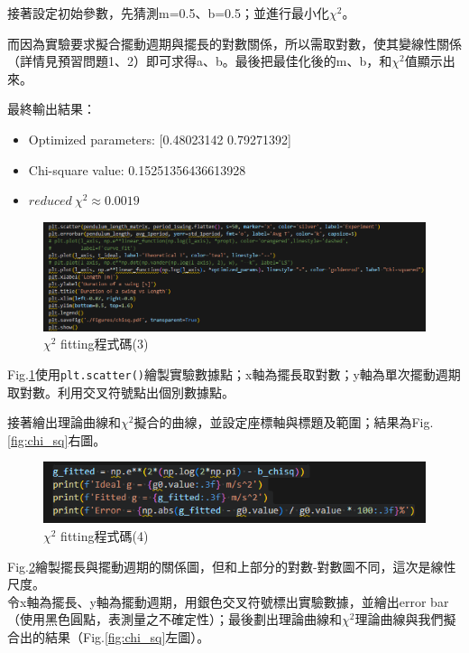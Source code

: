 \documentclass[12pt,a4paper]{article}
\begin{document}
\begin{CJK}{UTF8}{bkai}
接著設定初始參數，先猜測m=0.5、b=0.5；並進行最小化$\chi^2$。

而因為實驗要求擬合擺動週期與擺長的對數關係，所以需取對數，使其變線性關係（詳情見預習問題1、2）即可求得a、b。最後把最佳化後的m、b，和$\chi^2$值顯示出來。

最終輸出結果：
\begin{itemize}
    \item Optimized parameters: [0.48023142 0.79271392]
    \item Chi-square value: 0.15251356436613928
    \item $reduced \ \chi^2 \approx 0.0019$
\end{itemize}



\begin{figure}[h]
    \centering
    \includegraphics[width=1\linewidth]{chi3.png}
    \caption{$\chi ^2$ fitting程式碼(3)}
    \label{fig:chi3}
\end{figure}


Fig.\ref{fig:chi3}使用\texttt{plt.scatter()}繪製實驗數據點；x軸為擺長取對數；y軸為單次擺動週期取對數。利用交叉符號點出個別數據點。

\clearpage
接著繪出理論曲線和$\chi^2$擬合的曲線，並設定座標軸與標題及範圍；結果為Fig.\ref{fig:chi_sq}右圖。

\begin{figure}[h]
    \centering
    \includegraphics[width=1\linewidth]{chi4.png}
    \caption{$\chi ^2$ fitting程式碼(4)}
    \label{fig:chi4}
\end{figure}

\indent Fig.\ref{fig:chi4}繪製擺長與擺動週期的關係圖，但和上部分的對數-對數圖不同，這次是線性尺度。\\
\indent 令x軸為擺長、y軸為擺動週期，用銀色交叉符號標出實驗數據，並繪出error bar（使用黑色圓點，表測量之不確定性）；最後劃出理論曲線和$\chi^2$理論曲線與我們擬合出的結果（Fig.\ref{fig:chi_sq}左圖）。


\end{CJK}
\end{document}
